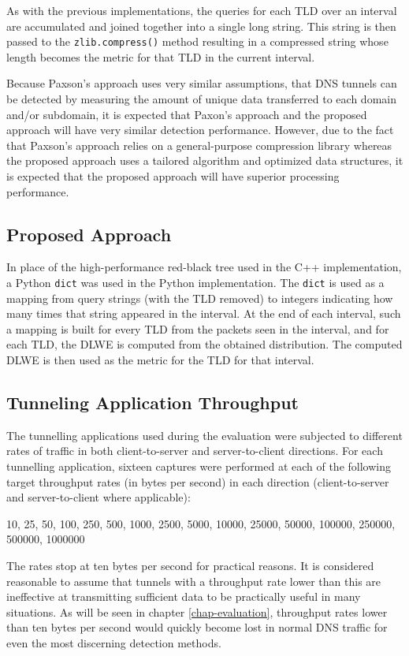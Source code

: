 \documentclass[12pt]{report}
\theoremstyle{remark}
\theoremstyle{definition}
\theoremstyle{definition}
\theoremstyle{definition}
\begin{document}
As with the previous implementations, the queries for each TLD over an interval
are accumulated and joined together into a single long string. This string is
then passed to the \texttt{zlib.compress()} method resulting in a compressed
string whose length becomes the metric for that TLD in the current interval.

Because Paxson's approach uses very similar assumptions, that DNS tunnels can be
detected by measuring the amount of unique data transferred to each domain
and/or subdomain, it is expected that Paxon's approach and the proposed approach
will have very similar detection performance. However, due to the fact that
Paxson's approach relies on a general-purpose compression library whereas the
proposed approach uses a tailored algorithm and optimized data structures, it is
expected that the proposed approach will have superior processing performance.

\subsection{Proposed Approach}
\label{proposed-method-python}
In place of the high-performance red-black tree used in the C++ implementation,
a Python \texttt{dict} was used in the Python implementation. The \texttt{dict}
is used as a mapping from query strings (with the TLD removed) to integers
indicating how many times that string appeared in the interval. At the end of
each interval, such a mapping is built for every TLD from the packets seen in
the interval, and for each TLD, the DLWE is computed from the obtained
distribution. The computed DLWE is then used as the metric for the TLD for that
interval.

\subsection{Tunneling Application Throughput}
\label{tunapptp}
The tunnelling applications used during the evaluation were subjected to
different rates of traffic in both client-to-server and server-to-client
directions. For each tunnelling application, sixteen captures were performed at
each of the following target throughput rates (in bytes per second) in each
direction (client-to-server and server-to-client where applicable):

10, 25, 50, 100, 250, 500, 1000, 2500, 5000, 10000, 25000, 50000, 100000,
250000, 500000, 1000000

The rates stop at ten bytes per second for practical reasons. It is considered
reasonable to assume that tunnels with a throughput rate lower than this are
ineffective at transmitting sufficient data to be practically useful in many
situations. As will be seen in chapter \ref{chap-evaluation}, throughput rates
lower than ten bytes per second would quickly become lost in normal DNS
traffic for even the most discerning detection methods.
\end{document}
